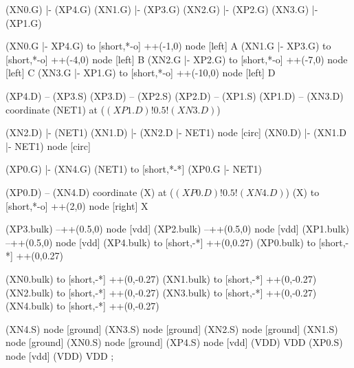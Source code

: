 \begin{circuitikz}[american]
	
	(XN0.G) |- (XP4.G)
	(XN1.G) |- (XP3.G)
	(XN2.G) |- (XP2.G)
	(XN3.G) |- (XP1.G)
	
	(XN0.G |- XP4.G) to [short,*-o] ++(-1,0) node [left] {A}
	(XN1.G |- XP3.G) to [short,*-o] ++(-4,0) node [left] {B}
	(XN2.G |- XP2.G) to [short,*-o] ++(-7,0) node [left] {C}
	(XN3.G |- XP1.G) to [short,*-o] ++(-10,0) node [left] {D}
	
	(XP4.D) -- (XP3.S)
	(XP3.D) -- (XP2.S)
	(XP2.D) -- (XP1.S)
	(XP1.D) -- (XN3.D)
	coordinate (NET1) at ($(XP1.D)!0.5!(XN3.D)$)	
	
	(XN2.D) |- (NET1)
	(XN1.D) |- (XN2.D |- NET1) node [circ] {}
	(XN0.D) |- (XN1.D |- NET1) node [circ] {}
	
	(XP0.G) |- (XN4.G)
	(NET1) to [short,*-*] (XP0.G |- NET1)
	
	(XP0.D) -- (XN4.D)
	coordinate (X) at ($(XP0.D)!0.5!(XN4.D)$)
	(X) to [short,*-o] ++(2,0) node [right] {X}
	
	(XP3.bulk) --++(0.5,0) node [vdd]{}
	(XP2.bulk) --++(0.5,0) node [vdd]{}
	(XP1.bulk) --++(0.5,0) node [vdd]{}
	(XP4.bulk) to [short,-*] ++(0,0.27)
	(XP0.bulk) to [short,-*] ++(0,0.27)
	
	(XN0.bulk) to [short,-*] ++(0,-0.27)
	(XN1.bulk) to [short,-*] ++(0,-0.27)
	(XN2.bulk) to [short,-*] ++(0,-0.27)
	(XN3.bulk) to [short,-*] ++(0,-0.27)
	(XN4.bulk) to [short,-*] ++(0,-0.27)
	

	(XN4.S) node [ground] {}
	(XN3.S) node [ground] {}
	(XN2.S) node [ground] {}
	(XN1.S) node [ground] {}
	(XN0.S) node [ground] {}
	(XP4.S) node [vdd] (VDD) {VDD}
	(XP0.S) node [vdd] (VDD) {VDD}
;

\end{circuitikz}
